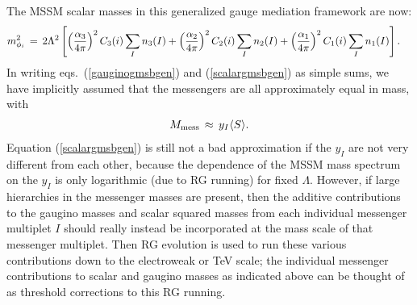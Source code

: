 \documentclass[12pt]{article}
\def\beq{\begin{eqnarray}}
\def\eeq{\end{eqnarray}}
\begin{document}
The MSSM scalar masses in this generalized gauge mediation framework are
now:
\beq  
m^2_{\phi_i} \,=\,
2 \Lambda^2
\left [ \left ({\alpha_3\over 4\pi}\right )^2 C_3(i) \sum_I n_3(I) +
\left ({\alpha_2\over 4 \pi}\right )^2 C_2(i) \sum_I n_2(I)+
\left ({\alpha_1\over 4 \pi}\right )^2 C_1(i) \sum_I n_1(I)
\right ] .\phantom{xx}
\label{scalargmsbgen}
\eeq
In writing eqs.~(\ref{gauginogmsbgen}) and (\ref{scalargmsbgen}) as simple
sums, we have implicitly assumed that the messengers are all approximately
equal in mass, with
\beq
M_{\rm mess} \,\approx\, y_I \langle S \rangle .
\eeq
Equation (\ref{scalargmsbgen}) is still not a bad approximation if the 
$y_I$ are not very different from each other, because the dependence of 
the MSSM mass spectrum on the $y_I$ is only logarithmic (due to RG 
running) for fixed $\Lambda$. However, if large hierarchies in the 
messenger masses are present, then the additive contributions to the 
gaugino masses and scalar squared masses from each individual messenger 
multiplet $I$ should really instead be incorporated at the mass scale of 
that messenger multiplet. Then RG evolution is used to run these various 
contributions down to the electroweak or TeV scale; the individual 
messenger contributions to scalar and gaugino masses as indicated above 
can be thought of as threshold corrections to this RG running.
\end{document}
